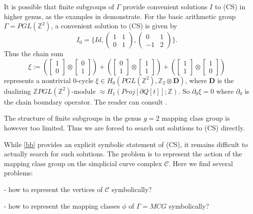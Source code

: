 \documentclass[12pt]{amsart}
\theoremstyle{definition}
\theoremstyle{remark}
\newcommand{\bZ}{\mathbb{Z}}
\newcommand{\del}{\partial}
\newcommand{\sC}{\mathscr{C}}
\begin{document}
It is possible that finite subgroups of $\Gamma$ provide convenient solutions $I$ to (CS) in higher genus, as the examples in \cite{Cremona} demonstrate. For the basic arithmetic group $\Gamma=PGL(\bZ^2)$, a convenient solution to (CS) is given by $$I_0=\{Id, \begin{pmatrix} 1 & 1 \\ 0 & 1 \end{pmatrix}, \begin{pmatrix} 0 & 1 \\ -1 & 2 \end{pmatrix}\}.$$ Thus the chain sum $$\xi:= 
(\begin{bmatrix} 1 \\ 0 \end{bmatrix} \otimes \begin{bmatrix} 0 \\ 1 \end{bmatrix}) + 
(\begin{bmatrix} 0 \\ 1 \end{bmatrix} \otimes \begin{bmatrix} 1 \\ 1 \end{bmatrix}) +
(\begin{bmatrix} 1 \\ 1 \end{bmatrix} \otimes \begin{bmatrix} 1 \\ 0 \end{bmatrix}) $$ represents a nontrivial $0$-cycle $\xi \in H_0(PGL(\bZ^2) , \bZ_2 \otimes \textbf{D})$, where $\textbf{D}$ is the dualizing $\bZ PGL(\bZ^2)$-module $\approx H_1(Proj[\del Q[t]]; \bZ)$. So $\del_0 \xi=0$ where $\del_0$ is the chain boundary operator. The reader can consult \cite[]{martel}. 

The structure of finite subgroups in the genus $g=2$ mapping class group is however too limited. Thus we are forced to search out solutions to (CS) directly.

While \eqref{bb} provides an explicit symbolic statement of (CS), it remains difficult to actually search for such solutions. The problem is to represent the action of the mapping class group on the simplicial curve complex $\sC$. Here we find several problems: 

- how to represent the vertices of $\sC$ symbolically?

- how to represent the mapping classes $\phi$ of $\Gamma=MCG$ symbolically?
\end{document}
